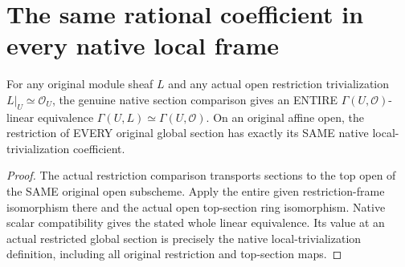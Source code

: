 \section{The same rational coefficient in every native local frame}
\label{sec:native-line-section-ratios}

\begin{definition}
\label{sc0-native-line-ratio:whole-frame}
\leanok
For any original module sheaf $L$ and any actual open restriction
trivialization $L|_U\simeq\mathcal O_U$, the genuine native section
comparison gives an ENTIRE $\Gamma(U,\mathcal O)$-linear equivalence
$\Gamma(U,L)\simeq\Gamma(U,\mathcal O)$. On an original affine open,
the restriction of EVERY original global section has exactly its
SAME native local-trivialization coefficient.
\end{definition}
\begin{proof}
The actual restriction comparison transports sections to the top
open of the SAME original open subscheme. Apply the entire given
restriction-frame isomorphism there and the actual open top-section
ring isomorphism. Native scalar compatibility gives the stated
whole linear equivalence. Its value at an actual restricted global
section is precisely the native local-trivialization definition,
including all original restriction and top-section maps.
\end{proof}

